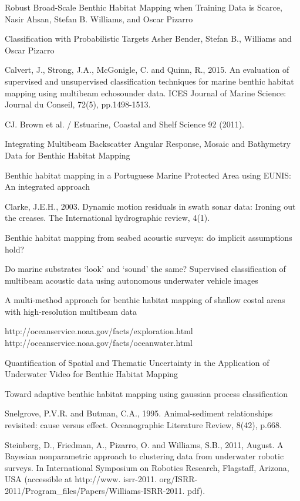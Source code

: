 \documentclass[12pt]{article}
\begin{document}
\newpage
\begin{thebibliography}{9}

        Robust Broad-Scale Benthic Habitat Mapping when Training Data is Scarce, Nasir Ahsan, Stefan B. Williams, and Oscar Pizarro

        Classification with Probabilistic Targets Asher Bender, Stefan B., Williams and Oscar Pizarro

        Calvert, J., Strong, J.A., McGonigle, C. and Quinn, R., 2015. An evaluation of supervised and unsupervised classification techniques for marine benthic habitat mapping using multibeam echosounder data. ICES Journal of Marine Science: Journal du Conseil, 72(5), pp.1498-1513.

        CJ. Brown et al. / Estuarine, Coastal and Shelf Science 92 (2011).

        Integrating Multibeam Backscatter Angular Response, Mosaic and Bathymetry Data for Benthic Habitat Mapping

        Benthic habitat mapping in a Portuguese Marine Protected Area using EUNIS: An integrated approach

        Clarke, J.E.H., 2003. Dynamic motion residuals in swath sonar data: Ironing out the creases. The International hydrographic review, 4(1).

        Benthic habitat mapping from seabed acoustic surveys: do implicit assumptions hold?

        Do marine substrates ‘look’ and ‘sound’ the same? Supervised classification of multibeam acoustic data using autonomous underwater vehicle images

        A multi-method approach for benthic habitat mapping of shallow costal areas with high-resolution multibeam data

        http://oceanservice.noaa.gov/facts/exploration.html
        http://oceanservice.noaa.gov/facts/oceanwater.html

        Quantification of Spatial and Thematic Uncertainty in the Application of Underwater Video for Benthic Habitat Mapping

        Toward adaptive benthic habitat mapping using gaussian process classification

        Snelgrove, P.V.R. and Butman, C.A., 1995. Animal-sediment relationships revisited: cause versus effect. Oceanographic Literature Review, 8(42), p.668.

        Steinberg, D., Friedman, A., Pizarro, O. and Williams, S.B., 2011, August. A Bayesian nonparametric approach to clustering data from underwater robotic surveys. In International Symposium on Robotics Research, Flagstaff, Arizona, USA (accessible at http://www. isrr-2011. org/ISRR-2011/Program\_files/Papers/Williams-ISRR-2011. pdf).

\end{thebibliography}
\end{document}
